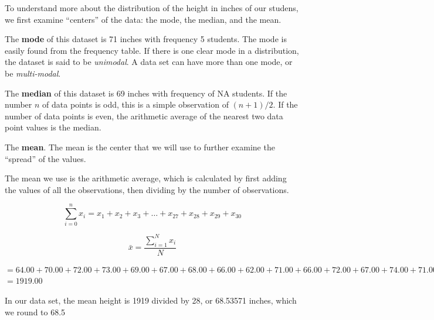 \documentclass[nohyper,justified]{tufte-handout}\usepackage[]{graphicx}\usepackage[]{color}
\begin{document}
To understand more about the distribution of the height in inches of our studens, we first examine ``centers'' of the data: the mode, the median, and the mean.

The \textbf{mode} of this dataset is 71 inches with frequency 5 students. The mode is easily found from the frequency table. If there is one clear mode in a distribution, the dataset is said to be \emph{unimodal}. A data set can have more than one mode, or be \emph{multi-modal}.

The \textbf{median} of this dataset is 69 inches with frequency of NA students. If the number $n$ of data points is odd, this is a simple observation of $(n+1)/2$. If the number of data points is even, the arithmetic average of the nearest two data point values is the median.

The \textbf{mean}. The mean is the center that we will use to further examine the ``spread'' of the values.

The mean we use is the arithmetic average, which is calculated by first adding the values of all the observations, then dividing by the number of observations.

\begin{equation*}
\sum\limits_{i=0}^{n} x_i = x_1+x_2+x_3+ \dots +x_{27}+x_{28}+x_{29}+x_{30} 
\end{equation*}

\begin{equation*}
\bar{x}=\frac{\sum\limits_{i=1}^{N} x_i }{N} 
\end{equation*}

$=  64.00 + 70.00 + 72.00 + 73.00 + 69.00 + 67.00 + 68.00 + 66.00 + 62.00 + 71.00 + 66.00 + 72.00 + 67.00 + 74.00 + 71.00 + 72.00 + 67.00 + 71.00 + 65.00 + 65.00 + 69.00 + 71.00 + 69.00 + 72.00 + 71.00 + 68.00 + 63.00 +64.00 $
$= 1919.00 $


In our data set, the mean height is 1919 divided by 28, or 68.53571 inches, which we round to 68.5
\end{document}
